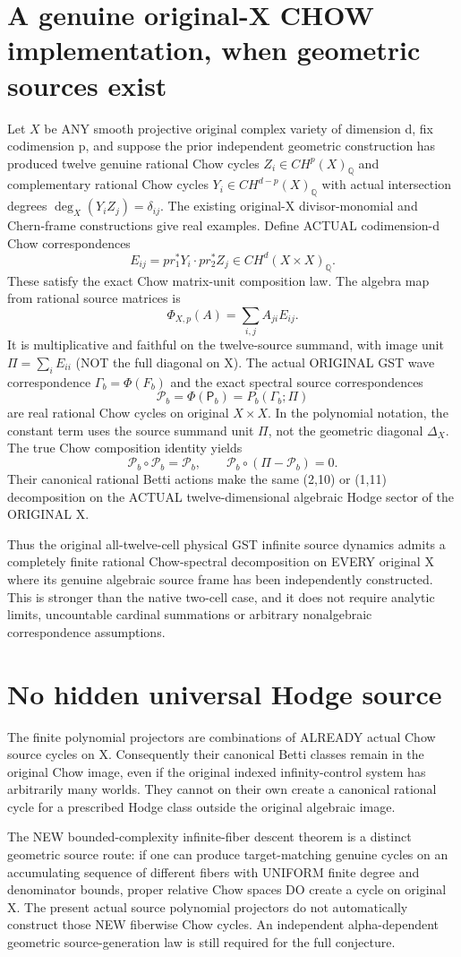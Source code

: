 \documentclass{article}
\begin{document}
\section{A genuine original-X CHOW implementation, when geometric sources exist}
Let $X$ be ANY smooth projective original complex
variety of dimension d, fix codimension p,
and suppose the prior independent geometric construction
has produced twelve genuine rational Chow cycles
$Z_i\in CH^p(X)_{\mathbb Q}$ and complementary
rational Chow cycles $Y_i\in CH^{d-p}(X)_{\mathbb Q}$
with actual intersection degrees $\deg_X(Y_iZ_j)=\delta_{ij}$.
The existing original-X divisor-monomial and
Chern-frame constructions give real examples.
Define ACTUAL codimension-d Chow correspondences
\[
E_{ij}=pr_1^*Y_i\cdot pr_2^*Z_j
\in CH^d(X\times X)_{\mathbb Q}.
\]
These satisfy the exact Chow matrix-unit
composition law. The algebra map from
rational source matrices is
\[
\Phi_{X,p}(A)=\sum_{i,j} A_{ji}E_{ij}.
\]
It is multiplicative and faithful on the twelve-source
summand, with image unit
$\Pi=\sum_i E_{ii}$ (NOT the full diagonal on X).
The actual ORIGINAL GST wave correspondence
$\Gamma_b=\Phi(F_b)$ and the exact spectral
source correspondences
\[
\boxed{\mathcal P_b=\Phi(\mathsf P_b)
=P_b(\Gamma_b;\Pi)}
\]
are real rational Chow cycles on original $X\times X$.
In the polynomial notation, the constant
term uses the source summand unit $\Pi$, not
the geometric diagonal $\Delta_X$.
The true Chow composition identity yields
\[
\mathcal P_b\circ\mathcal P_b=\mathcal P_b,
\qquad
\mathcal P_b\circ(\Pi-\mathcal P_b)=0.
\]
Their canonical rational Betti actions make
the same (2,10) or (1,11) decomposition
on the ACTUAL twelve-dimensional algebraic
Hodge sector of the ORIGINAL X.

Thus the original all-twelve-cell
physical GST infinite source dynamics
admits a completely finite rational
Chow-spectral decomposition on EVERY
original X where its genuine algebraic
source frame has been independently constructed.
This is stronger than the native two-cell
case, and it does not require analytic limits,
uncountable cardinal summations or arbitrary
nonalgebraic correspondence assumptions.

\section{No hidden universal Hodge source}
The finite polynomial projectors are combinations
of ALREADY actual Chow source cycles on X.
Consequently their canonical Betti classes
remain in the original Chow image,
even if the original indexed infinity-control
system has arbitrarily many worlds.
They cannot on their own create a canonical
rational cycle for a prescribed Hodge class
outside the original algebraic image.

The NEW bounded-complexity infinite-fiber
descent theorem is a distinct geometric
source route: if one can produce target-matching
genuine cycles on an accumulating sequence of
different fibers with UNIFORM finite degree
and denominator bounds, proper relative
Chow spaces DO create a cycle on original X.
The present actual source polynomial projectors
do not automatically construct those NEW
fiberwise Chow cycles. An independent
alpha-dependent geometric source-generation
law is still required for the full conjecture.
\end{document}
